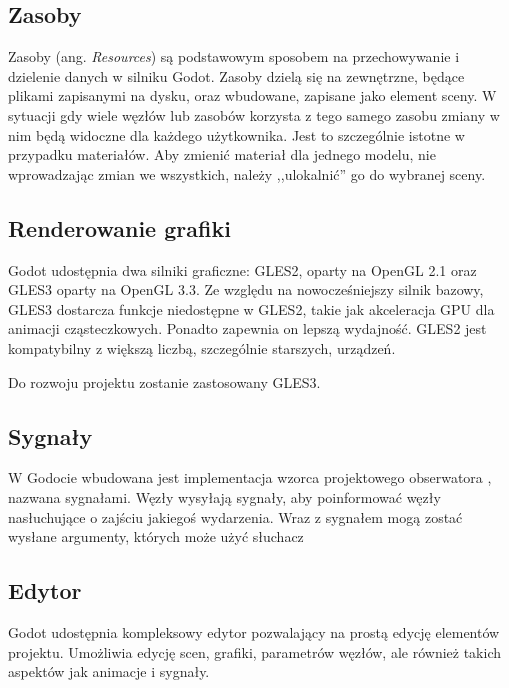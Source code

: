 \subsection{Zasoby}
Zasoby (ang. \emph{Resources}) są podstawowym sposobem na przechowywanie i dzielenie danych w silniku Godot. Zasoby dzielą się na zewnętrzne, będące plikami zapisanymi na dysku, oraz wbudowane, zapisane jako element sceny. W sytuacji gdy wiele węzłów lub zasobów korzysta z tego samego zasobu zmiany w nim będą widoczne dla każdego użytkownika. Jest to szczególnie istotne w przypadku materiałów. Aby zmienić materiał dla jednego modelu, nie wprowadzając zmian we wszystkich, należy ,,ulokalnić'' go do wybranej sceny. 

\subsection{Renderowanie grafiki}
Godot udostępnia dwa silniki graficzne: GLES2, oparty na OpenGL 2.1 oraz GLES3 oparty na OpenGL 3.3. Ze względu na nowocześniejszy silnik bazowy, GLES3 dostarcza funkcje niedostępne w GLES2, takie jak akceleracja GPU dla animacji cząsteczkowych. Ponadto zapewnia on lepszą wydajność. GLES2 jest kompatybilny z większą liczbą, szczególnie starszych, urządzeń.

Do rozwoju projektu zostanie zastosowany GLES3.

\subsection{Sygnały}
W Godocie wbudowana jest implementacja wzorca projektowego obserwatora \cite{game_programming_patterns}, nazwana sygnałami. Węzły wysyłają sygnały, aby poinformować węzły nasłuchujące o zajściu jakiegoś wydarzenia. Wraz z sygnałem mogą zostać wysłane argumenty, których może użyć słuchacz

\subsection{Edytor}
Godot udostępnia kompleksowy edytor pozwalający na prostą edycję elementów projektu. Umożliwia edycję scen, grafiki, parametrów węzłów, ale również takich aspektów jak animacje i sygnały.


